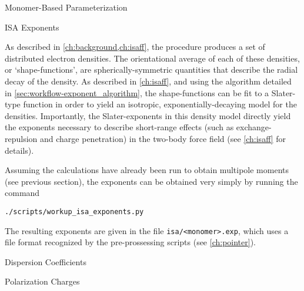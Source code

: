 \begin{section}{Monomer-Based Parameterization}
\begin{subsection}{ISA Exponents}

As described in \cref{ch:background,ch:isaff}, the \isa procedure
produces a set of distributed \aim electron densities. The
orientational average of each of these \aim densities, or
`shape-functions', are spherically-symmetric quantities that describe the
radial decay of the \aim density.\cite{Misquitta2014} As described in
\cref{ch:isaff}, and using the algorithm detailed in 
\cref{sec:workflow-exponent_algorithm},
the shape-functions can be fit to a Slater-type function in
order to yield an isotropic, exponentially-decaying model for the \isa
densities. Importantly, the Slater-exponents in this density model directly
yield the exponents necessary to describe short-range effects (such as
exchange-repulsion and charge penetration) in the two-body force
field (see \cref{ch:isaff} for details).

Assuming the \isa calculations have already been run to obtain multipole
moments (see previous section), the \isa exponents can be obtained very simply
by running the command
%
\begin{lstlisting}
./scripts/workup_isa_exponents.py
\end{lstlisting}
%
The resulting exponents are given in the file \verb|isa/<monomer>.exp|, which
uses a file format recognized by the \pointer pre-prossessing scripts (see
\cref{ch:pointer}).

\end{subsection}


\begin{subsection}{Dispersion Coefficients}
\label{sec:workflow-dispersion}



\end{subsection}

\begin{subsection}{Polarization Charges}
\label{sec:workflow-polarizabilities}



\end{subsection}

\end{section}
